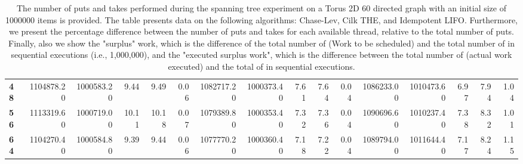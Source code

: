 \begin{table}[!ht]
{\begin{tabular}{lrrrrrrrrrrrrrrr}
\textbf{48} & 1104878.20 & 1000583.20 &           9.44 &        9.49 &                 0.06 & 1082717.20 & 1000373.40 &           7.61 &        7.64 &                 0.04 &      1086233.00 & 1010473.60 &           6.97 &        7.94 &                 1.04 \\
\textbf{56} & 1113319.60 & 1000719.00 &          10.11 &       10.18 &                 0.07 & 1079389.80 & 1000353.40 &           7.32 &        7.36 &                 0.04 &      1090696.60 & 1010237.40 &           7.38 &        8.32 &                 1.01 \\
\textbf{64} & 1104270.40 & 1000584.80 &           9.39 &        9.44 &                 0.06 & 1077770.20 & 1000360.40 &           7.18 &        7.22 &                 0.04 &      1089794.00 & 1011644.40 &           7.17 &        8.24 &                 1.15 \\
\bottomrule
\end{tabular}}
\label{difference-Torus_2D_60_directed-1000000-CHASELEV-CILK-IDEMPOTENT_LIFO}
\caption{The number of puts and takes performed during the
    spanning tree experiment on a Torus 2D 60 directed graph with an initial size
    of 1000000 items is provided. The table presents data on the
    following algorithms: Chase-Lev, Cilk THE, and
    Idempotent LIFO. Furthermore, we present the percentage difference
    between the number of puts and takes for each available thread,
    relative to the total number of puts. Finally, also we show the
    "surplus" work, which is the difference of the total number of
    \Puts (Work to be scheduled) and the total number of \Puts in
    sequential executions (i.e., 1,000,000), and the "executed surplus
    work", which is the difference between the total number of \Takes
    (actual work executed) and the total of \Takes in sequential
    executions.}
\end{table}
